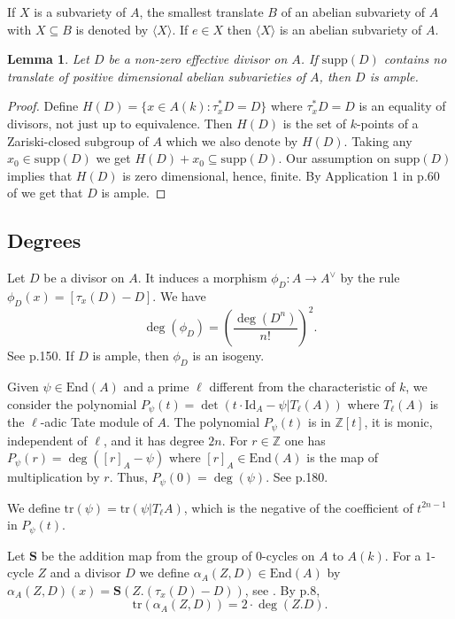 \documentclass[11pt]{amsart}
\newtheorem{lemma}[theorem]{Lemma}
\theoremstyle{remark}
\numberwithin{equation}{section}
\newcommand{\Z}{\mathbb{Z}}
\newcommand{\End}{\mathrm{End}}
\newcommand{\supp}{\mathrm{supp}}
\newcommand{\tr}{\mathrm{tr}}
\newcommand{\Id}{\mathrm{Id}}
\newcommand{\Sbf}{\mathbf{S}}
\begin{document}
If $X$ is a subvariety of $A$, the smallest translate $B$ of an abelian subvariety of $A$ with $X\subseteq B$ is denoted by $\langle X\rangle$. If $e\in X$ then $\langle X\rangle$ is an abelian subvariety of $A$.

\begin{lemma}\label{LemmaAmpleAbVar} Let $D$ be a non-zero effective divisor on $A$. If $\supp(D)$ contains no translate of positive dimensional abelian subvarieties of $A$, then $D$ is ample.
\end{lemma}
\begin{proof} Define $H(D)=\{x\in A(k) : \tau_x^*D=D\}$ where $\tau_x^*D=D$ is an equality of divisors, not just up to equivalence. Then $H(D)$ is the set of $k$-points of a Zariski-closed subgroup of $A$ which we also denote by $H(D)$. Taking any $x_0\in \supp(D)$ we get $H(D)+x_0\subseteq \supp(D)$. Our assumption on $\supp(D)$ implies that $H(D)$ is zero dimensional, hence, finite. By Application 1 in p.60 of \cite{Mumford} we get that $D$ is ample.
\end{proof}

\subsection{Degrees} Let $D$ be a divisor on $A$. It induces a morphism $\phi_D: A\to A^\vee$ by the rule $\phi_D(x) = [\tau_x(D)-D]$. We have 
$$
\deg(\phi_D)= \left(\frac{\deg(D^n)}{n!}\right)^2.
$$
See \cite{Mumford} p.150. If $D$ is ample, then $\phi_D$ is an isogeny.

Given $\psi\in \End(A)$ and a prime $\ell$ different from the characteristic of $k$, we consider the polynomial $P_\psi(t)=\det(t\cdot \Id_A-\psi | T_\ell (A))$ where $T_\ell(A)$ is the $\ell$-adic Tate module of $A$. The polynomial $P_\psi(t)$ is in $\Z[t]$, it is monic, independent of $\ell$, and it has degree $2n$. For $r\in \Z$ one has $P_\psi(r)=\deg([r]_A -\psi)$ where $[r]_A\in \End(A)$ is the map of multiplication by $r$. Thus, $P_\psi(0)=\deg(\psi)$. See \cite{Mumford} p.180. 

We define $\tr(\psi)=\tr(\psi| T_\ell A)$, which is the negative of the coefficient of $t^{2n-1}$ in $P_\psi(t)$.


Let $\Sbf$ be the addition map from the group of $0$-cycles on $A$ to $A(k)$. For a $1$-cycle $Z$ and a divisor $D$ we define $\alpha_A(Z,D)\in \End(A)$ by $\alpha_A(Z,D)(x)=\Sbf(Z.(\tau_x(D)-D))$, see \cite{Morikawa, Matsusaka}. By \cite{Matsusaka} p.8, 
\begin{equation}\label{EqnTrAlpha}
\tr(\alpha_A(Z,D)) = 2\cdot \deg(Z.D).
\end{equation}
\end{document}
